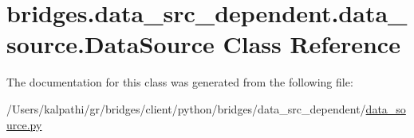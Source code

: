 \hypertarget{classbridges_1_1data__src__dependent_1_1data__source_1_1_data_source}{}\section{bridges.\+data\+\_\+src\+\_\+dependent.\+data\+\_\+source.\+Data\+Source Class Reference}
\label{classbridges_1_1data__src__dependent_1_1data__source_1_1_data_source}


The documentation for this class was generated from the following file\+:\begin{DoxyCompactItemize}
\item 
/\+Users/kalpathi/gr/bridges/client/python/bridges/data\+\_\+src\+\_\+dependent/\mbox{\hyperlink{data__source_8py}{data\+\_\+source.\+py}}\end{DoxyCompactItemize}

